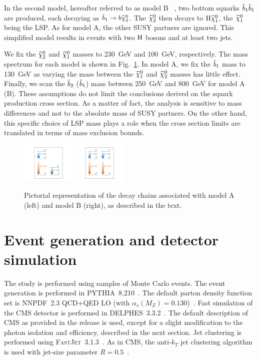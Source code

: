 In the second model, hereafter referred to as model B ~\cite{annthesis}, two bottom
squarks $\tilde{b}_1\tilde{b}_1$ are produced, each decaying as
$\tilde{b}_1 \to b \widetilde{\chi}^{0}_2$. The $\widetilde{\chi}^{0}_2$ then decays to $\mathrm{H}
\widetilde{\chi}^{0}_1$, the $\widetilde{\chi}^{0}_1$ being the LSP. As for model A, the other SUSY
partners are ignored. This simplified model results
in events with two $\mathrm{H}$ bosons and at least two jets.

We fix the $\widetilde{\chi}^{0}_2$ and $\widetilde{\chi}^{0}_1$ masses to 230~GeV
and 100~GeV, respectively. 
The mass spectrum for each model is shown in
Fig.~\ref{fig:simplifiedModels}.
In model A, %
we fix the $\tilde{b}_1$ mass to 130~GeV as varying the mass
between the $\widetilde{\chi}^{0}_1$ and $\widetilde{\chi}^{0}_2$ masses has little effect.
Finally, we scan the $\tilde{b}_2$ ($\tilde{b}_1$) mass between 250~GeV
and 800~GeV for model A (B). These assumptions do not limit the
conclusions derived on the squark production cross section. As a
matter of fact, the analysis is sensitive to mass differences and not
to the absolute mass of SUSY partners. On the other hand, this specific
choice of LSP mass plays a role when the cross section limits are
translated in terms of mass exclusion bounds.

\begin{figure}[htb]
\includegraphics[width=0.23\textwidth,viewport=250 100 800 700,clip=true]{figs/pheno/model1}
\includegraphics[width=0.23\textwidth,viewport=250 100 800 700,clip=true]{figs/pheno/model2}
\caption{\label{fig:simplifiedModels} Pictorial representation of the
  decay chains associated with model A (left) and model B (right), as described in the text.}
\end{figure}

\section{Event generation and detector simulation}
\label{sec:gensim}
The study is performed using samples of Monte Carlo events. The event generation is performed in \textsc{PYTHIA}~8.210~\cite{Pythia64,Pythia82}.
The default parton density function set is \textsc{NNPDF}~2.3 QCD+QED
LO (with $\alpha_s(M_Z) =
0.130$)~\cite{NNPDF1,NNPDF2,NNPDF3}. Fast simulation of the CMS
detector is performed in \textsc{DELPHES}~3.3.2~\cite{Delphes3}. The
default description of CMS as provided in the release is used, except
for a slight modification to the photon isolation and efficiency,
described in the next section. Jet clustering is performed using
\textsc{FastJet}~3.1.3~\cite{fastjet}. As in CMS, the anti-$k_T$ jet
clustering algorithm is used with jet-size parameter $R=0.5$~\cite{antikt}.

